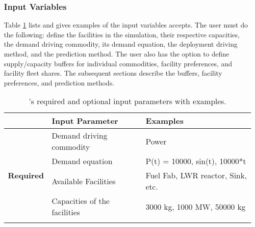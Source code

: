 \subsubsection{\textbf{Input Variables}}
Table \ref{tab:inputs} lists and gives examples of the input 
variables \deploy accepts. 
The user must do the following: 
define the facilities in the simulation, their respective 
capacities, the demand driving commodity,
its demand equation, the deployment driving method, 
and the prediction method. 
The user also has the option to define supply/capacity buffers 
for individual commodities, facility preferences, and facility 
fleet shares. 
The subsequent sections describe 
the buffers, facility preferences, and prediction methods. 

\begin{table}[]
    \centering
    \doublespacing
    \caption{\deploy's required and optional input parameters with examples.}
    \label{tab:inputs}
        \small
        \begin{tabular}{l|ll}
        \hline
            & \textbf{Input Parameter}                                                           & \textbf{Examples}                                                                                                          \\ \hline
            \multirow{5}{*}{\textbf{Required}} & Demand driving commodity                                                           & Power                                                                                                                      \\ \cline{2-3} 
                                                      & Demand equation                                                                    & P(t) = 10000, sin(t), 10000*t                                                                                                                 \\ \cline{2-3} 
                                                      & Available Facilities                                                             & Fuel Fab, LWR reactor, Sink, etc.                                                                                                      \\ \cline{2-3} 
                                                      & Capacities of the facilities                                                       & 3000 kg, 1000 MW, 50000 kg                                                                                                     \\ \cline{2-3} 

\end{tabular}
\end{table}

